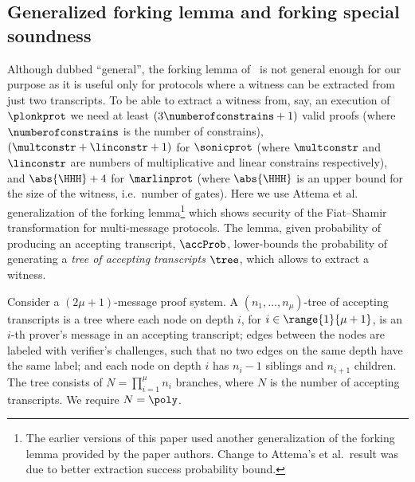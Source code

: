 \subsection{Generalized forking lemma and forking special soundness}
Although dubbed ``general'', the forking lemma of~\cite{CCS:BelNev06} is not general
enough for our purpose as it is useful only for protocols where a witness can be
extracted from just two transcripts. To be able to extract a witness from, say, an
execution of $\plonkprot$ we need at least $(3 \numberofconstrains + 1)$ valid proofs
(where $\numberofconstrains$ is the number of constrains),
$(\multconstr + \linconstr + 1)$ for $\sonicprot$ (where $\multconstr$ and
$\linconstr$ are numbers of multiplicative and linear constrains respectively), and
$\abs{\HHH} + 4$ for $\marlinprot$ (where $\abs{\HHH}$ is an upper bound for the size
of the witness, i.e.~number of gates). Here we use Attema et
al.~\cite{EPRINT:AttFehKlo21} generalization of the forking lemma\footnote{The
  earlier versions of this paper used another generalization of the forking lemma
  provided by the paper authors. Change to Attema's et al.~result was due to better
  extraction success probability bound.}  which shows security of the Fiat--Shamir
transformation for multi-message protocols. The lemma, given probability of producing
an accepting transcript, $\accProb$, lower-bounds the probability of generating a
\emph{tree of accepting transcripts} $\tree$, which allows to extract a witness.

\begin{definition}
	\label{def:tree_of_accepting_transcripts}
	Consider a $(2\mu + 1)$-message proof system. A $(n_1,
  \ldots, n_\mu)$-tree of accepting transcripts is a tree where each node on
  depth $i$, for $i \in \range{1}{\mu + 1}$, is an $i$-th prover's message in an
  accepting transcript; edges between the nodes are labeled with verifier's
  challenges, such that no two edges on the same depth have the same
  label; and each node on depth $i$ has $n_{i} - 1$ siblings and $n_{i +
    1}$ children. The tree consists of $N = \prod_{i = 1}^\mu n_i$
  branches, where $N$ is the number of accepting transcripts. We require $N = \poly$.
\end{definition}

\iffalse
		
